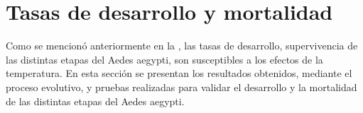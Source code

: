 \section{Tasas de desarrollo y mortalidad}
\label{sec:tasas-desarrollo-mortalidad}
Como se mencionó anteriormente en la , las tasas de desarrollo,
supervivencia de las distintas etapas del Aedes aegypti, son susceptibles a los efectos de la
temperatura. En esta sección se presentan los resultados obtenidos, mediante el proceso evolutivo,
y pruebas realizadas para validar el desarrollo y la mortalidad de las distintas etapas del Aedes
aegypti.





